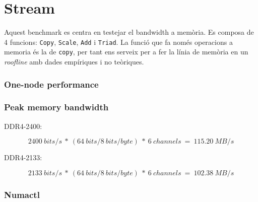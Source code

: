 \section{Stream}
Aquest benchmark es centra en testejar el bandwidth a memòria.
Es composa de 4 funcions: \texttt{Copy}, \texttt{Scale}, \texttt{Add} i \texttt{Triad}.
La funció que fa només operacions a memoria és la de \texttt{copy}, per tant ens serveix per a fer la línia de memòria en un \textit{roofline} amb dades empíriques i no teòriques.

\subsubsection{One-node performance}

\subsubsection{Peak memory bandwidth}

DDR4-2400:

\[2400\ bits/s\ *\ (64\ bits/8\ bits/byte)\ *\ 6\ channels\ =\ 115.20\ MB/s\]

DDR4-2133:

\[2133\ bits/s\ *\ (64\ bits/8\ bits/byte)\ *\ 6\ channels\ =\ 102.38\ MB/s\]

\subsubsection{Numactl}
